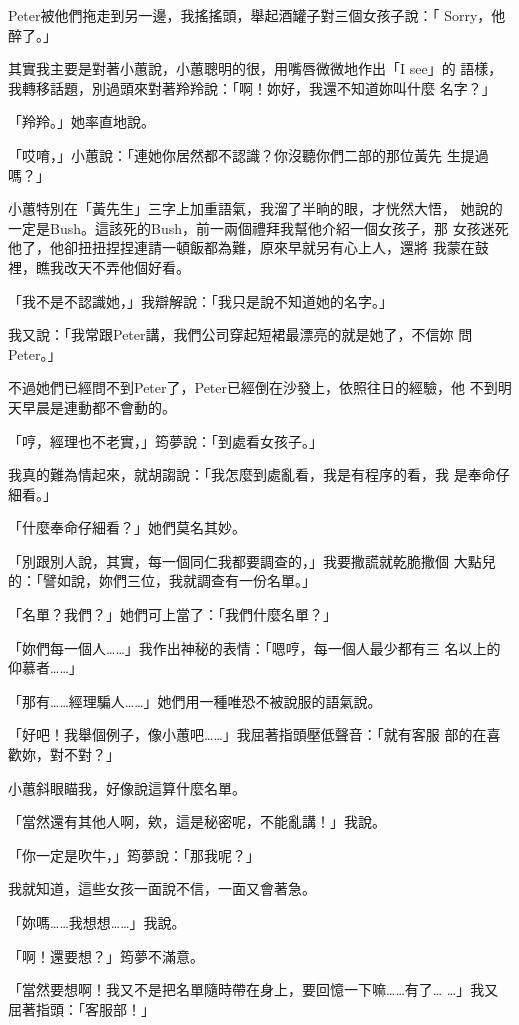 Peter被他們拖走到另一邊，我搖搖頭，舉起酒罐子對三個女孩子說：「
Sorry，他醉了。」

其實我主要是對著小蕙說，小蕙聰明的很，用嘴唇微微地作出「I see」的
語樣，我轉移話題，別過頭來對著羚羚說：「啊！妳好，我還不知道妳叫什麼
名字？」

「羚羚。」她率直地說。

「哎唷，」小蕙說：「連她你居然都不認識？你沒聽你們二部的那位黃先
生提過嗎？」

小蕙特別在「黃先生」三字上加重語氣，我溜了半晌的眼，才恍然大悟，
她說的一定是Bush。這該死的Bush，前一兩個禮拜我幫他介紹一個女孩子，那
女孩迷死他了，他卻扭扭捏捏連請一頓飯都為難，原來早就另有心上人，還將
我蒙在鼓裡，瞧我改天不弄他個好看。

「我不是不認識她，」我辯解說：「我只是說不知道她的名字。」

我又說：「我常跟Peter講，我們公司穿起短裙最漂亮的就是她了，不信妳
問Peter。」

不過她們已經問不到Peter了，Peter已經倒在沙發上，依照往日的經驗，他
不到明天早晨是連動都不會動的。

「哼，經理也不老實，」筠夢說：「到處看女孩子。」

我真的難為情起來，就胡謅說：「我怎麼到處亂看，我是有程序的看，我
是奉命仔細看。」

「什麼奉命仔細看？」她們莫名其妙。

「別跟別人說，其實，每一個同仁我都要調查的，」我要撒謊就乾脆撒個
大點兒的：「譬如說，妳們三位，我就調查有一份名單。」

「名單？我們？」她們可上當了：「我們什麼名單？」

「妳們每一個人……」我作出神秘的表情：「嗯哼，每一個人最少都有三
名以上的仰慕者……」

「那有……經理騙人……」她們用一種唯恐不被說服的語氣說。

「好吧！我舉個例子，像小蕙吧……」我屈著指頭壓低聲音：「就有客服
部的在喜歡妳，對不對？」

小蕙斜眼瞄我，好像說這算什麼名單。

「當然還有其他人啊，欸，這是秘密呢，不能亂講！」我說。

「你一定是吹牛，」筠夢說：「那我呢？」

我就知道，這些女孩一面說不信，一面又會著急。

「妳嗎……我想想……」我說。

「啊！還要想？」筠夢不滿意。

「當然要想啊！我又不是把名單隨時帶在身上，要回憶一下嘛……有了…
…」我又屈著指頭：「客服部！」

